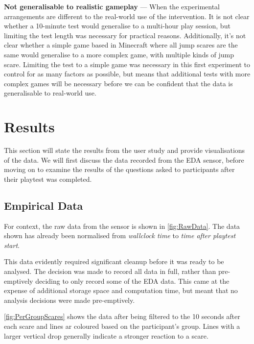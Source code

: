 \documentclass[12pt,a4paper]{article}\usepackage[]{graphicx}\usepackage[]{color}
\begin{document}
\textbf{Not generalisable to realistic gameplay} --- When the experimental arrangements are different to the real-world use of the intervention.
It is not clear whether a 10-minute test would generalise to a multi-hour play session, but limiting the test length was necessary for practical reasons.
Additionally, it's not clear whether a simple game based in Minecraft where all jump scares are the same would generalise to a more complex game, with multiple kinds of jump scare.
Limiting the test to a simple game was necessary in this first experiment to control for as many factors as possible, but means that additional tests with more complex games will be necessary before we can be confident that the data is generalisable to real-world use.

\section{Results}

This section will state the results from the user study and provide visualisations of the data.
We will first discuss the data recorded from the EDA sensor, before moving on to examine the results of the questions asked to participants after their playtest was completed.

\subsection{Empirical Data}
For context, the raw data from the sensor is shown in \vref{fig:RawData}.
The data shown has already been normalised from \emph{wallclock time} to \emph{time after playtest start}.

This data evidently required significant cleanup before it was ready to be analysed.
The decision was made to record all data in full, rather than pre-emptively deciding to only record some of the EDA data.
This came at the expense of additional storage space and computation time, but meant that no analysis decisions were made pre-emptively.

\vref{fig:PerGroupScares} shows the data after being filtered to the 10 seconds after each scare and lines ar coloured based on the participant's group.
Lines with a larger vertical drop generally indicate a stronger reaction to a scare.
\end{document}
